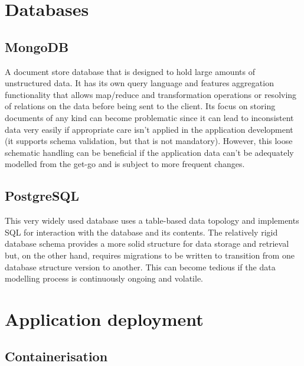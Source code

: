 \section{Databases}

\subsection{MongoDB}

A document store database that is designed to hold large amounts of unstructured data. It has its own query language and features aggregation functionality that allows map/reduce and transformation operations or resolving of relations on the data before being sent to the client. Its focus on storing documents of any kind can become problematic since it can lead to inconsistent data very easily if appropriate care isn't applied in the application development (it supports schema validation, but that is not mandatory). However, this loose schematic handling can be beneficial if the application data can't be adequately modelled from the get-go and is subject to more frequent changes.

\subsection{PostgreSQL}

This very widely used database uses a table-based data topology and implements \ac{SQL} for interaction with the database and its contents. The relatively rigid database schema provides a more solid structure for data storage and retrieval but, on the other hand, requires migrations to be written to transition from one database structure version to another. This can become tedious if the data modelling process is continuously ongoing and volatile.



\section{Application deployment}

\subsection{Containerisation}

